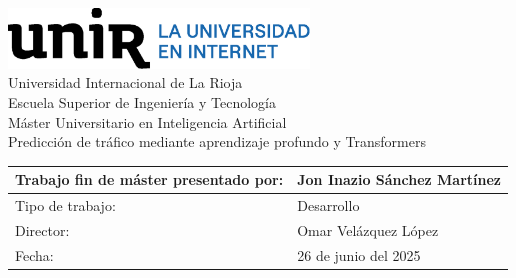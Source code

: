 \begin{titlepage}
	
	
	\centering
	\vspace{3cm}
	\includegraphics[width=0.60\textwidth]{includes/logoUnir.eps}\\	
	{\Huge Universidad Internacional de La Rioja \\}
	{\LARGE Escuela Superior de Ingeniería y Tecnología \\}
	\vspace{3cm}
	\setmainfont{Calibri Light}
	{\Large Máster Universitario en Inteligencia Artificial\\}
	\setmainfont{Calibri}
	{\Huge\textcolor{blueUnir}{Predicción de tráfico mediante aprendizaje profundo y Transformers} \\}
	\vfill{}
	\def\arraystretch{1}
	\setmainfont{Calibri Light}
	\begin{tabular}{| p{8cm} | p{7cm} |}
		\arrayrulecolor{gray80}
		\hline
		Trabajo fin de máster presentado por: & Jon Inazio Sánchez Martínez \\
		\hline
		Tipo de trabajo: & Desarrollo \\
		\hline
		Director: & Omar Velázquez López \\
		\hline
		Fecha: & 26 de junio del 2025 \\
		\hline
	\end{tabular}
\vspace{4cm}
\end{titlepage}